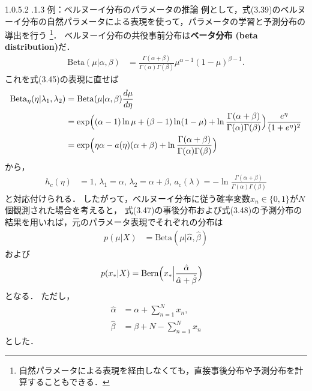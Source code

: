 \documentclass[11pt,a4paper]{jsarticle}
\makeatletter
\numberwithin{equation}{section}
\newcommand{\subsubsubsection}{\@startsection{paragraph}{4}{\z@}%
	{1.0\Cvs \@plus.5\Cdp \@minus.2\Cdp}%
	{.1\Cvs \@plus.3\Cdp}%
	{\reset@font\sffamily\normalsize}
}
\makeatother
\begin{document}
\subsubsubsection{例：ベルヌーイ分布のパラメータの推論}
例として，式(3.39)のベルヌーイ分布の自然パラメータによる表現を使って，パラメータの学習と予測分布の導出を行う
\footnote{
自然パラメータによる表現を経由しなくても，直接事後分布や予測分布を計算することもできる．
}．
ベルヌーイ分布の共役事前分布は\textbf{ベータ分布 (beta distribution)}だ．
\begin{align}
\mathrm{Beta} (\mu | \alpha, \beta)
& =
\frac{\Gamma(\alpha + \beta)}{\Gamma(\alpha) \Gamma(\beta)} \mu^{\alpha - 1} (1 - \mu)^{\beta - 1}.
\end{align}
これを式(3.45)の表現に直せば
\begin{align}
\mathrm{Beta}_{\eta} (\eta | \lambda_1, \lambda_2)
& =
\mathrm{Beta} (\mu | \alpha, \beta) \frac{d \mu}{d \eta} \nonumber \\
& =
\exp \Bigl( (\alpha - 1) \ln \mu + (\beta - 1) \ln (1 - \mu) + \ln \frac{\Gamma(\alpha + \beta)}{\Gamma(\alpha) \Gamma(\beta)} \Bigr) \frac{e^{\eta}}{(1 + e^{\eta})^2} \nonumber \\
& =
\exp \Bigl( \eta \alpha - a(\eta) (\alpha + \beta) + \ln \frac{\Gamma(\alpha + \beta)}{\Gamma(\alpha) \Gamma(\beta)} \Bigr)
\end{align}
から，
\begin{align}
h_c(\eta)
& =
1, \,
\lambda_1 = \alpha, \,
\lambda_2 = \alpha + \beta, \,
a_c(\lambda) = -\ln \frac{\Gamma(\alpha + \beta)}{\Gamma(\alpha) \Gamma(\beta)}
\end{align}
と対応付けられる．
したがって，ベルヌーイ分布に従う確率変数$x_n \in \{ 0, 1 \}$が$N$個観測された場合を考えると，
式(3.47)の事後分布および式(3.48)の予測分布の結果を用いれば，元のパラメータ表現でそれぞれの分布は
\begin{align}
p(\mu | X)
& =
\mathrm{Beta}(\mu | \hat{\alpha}, \hat{\beta})
\end{align}
および
\begin{align}
p(x_\ast | X)
& =
\mathrm{Bern} \Bigl( x_\ast \Big| \frac{\hat{\alpha}}{\hat{\alpha} + \hat{\beta}} \Bigr)
\end{align}
となる．
ただし，
\begin{align}
\hat{\alpha}
& =
\alpha + \sum_{n=1}^N x_n, \\
\hat{\beta}
& =
\beta + N - \sum_{n=1}^N x_n
\end{align}
とした．
\end{document}

